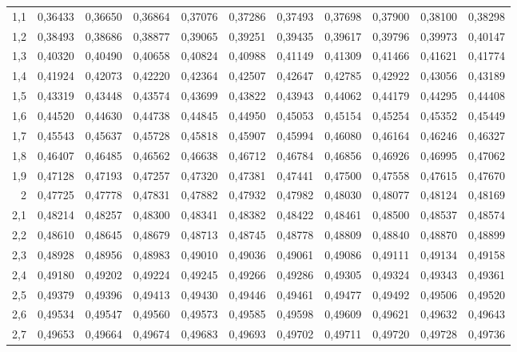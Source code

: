 \documentclass[12pt,a4paper]{article}
\begin{document}
\begin{table}[H]
\begin{tabular}{rrrrrrrrrrr}
    1,1   & 0,36433 & 0,36650 & 0,36864 & 0,37076 & 0,37286 & 0,37493 & 0,37698 & 0,37900 & 0,38100 & 0,38298 \\
    1,2   & 0,38493 & 0,38686 & 0,38877 & 0,39065 & 0,39251 & 0,39435 & 0,39617 & 0,39796 & 0,39973 & 0,40147 \\
    1,3   & 0,40320 & 0,40490 & 0,40658 & 0,40824 & 0,40988 & 0,41149 & 0,41309 & 0,41466 & 0,41621 & 0,41774 \\
    1,4   & 0,41924 & 0,42073 & 0,42220 & 0,42364 & 0,42507 & 0,42647 & 0,42785 & 0,42922 & 0,43056 & 0,43189 \\
    1,5   & 0,43319 & 0,43448 & 0,43574 & 0,43699 & 0,43822 & 0,43943 & 0,44062 & 0,44179 & 0,44295 & 0,44408 \\
    1,6   & 0,44520 & 0,44630 & 0,44738 & 0,44845 & 0,44950 & 0,45053 & 0,45154 & 0,45254 & 0,45352 & 0,45449 \\
    1,7   & 0,45543 & 0,45637 & 0,45728 & 0,45818 & 0,45907 & 0,45994 & 0,46080 & 0,46164 & 0,46246 & 0,46327 \\
    1,8   & 0,46407 & 0,46485 & 0,46562 & 0,46638 & 0,46712 & 0,46784 & 0,46856 & 0,46926 & 0,46995 & 0,47062 \\
    1,9   & 0,47128 & 0,47193 & 0,47257 & 0,47320 & 0,47381 & 0,47441 & 0,47500 & 0,47558 & 0,47615 & 0,47670 \\
    2     & 0,47725 & 0,47778 & 0,47831 & 0,47882 & 0,47932 & 0,47982 & 0,48030 & 0,48077 & 0,48124 & 0,48169 \\
    2,1   & 0,48214 & 0,48257 & 0,48300 & 0,48341 & 0,48382 & 0,48422 & 0,48461 & 0,48500 & 0,48537 & 0,48574 \\
    2,2   & 0,48610 & 0,48645 & 0,48679 & 0,48713 & 0,48745 & 0,48778 & 0,48809 & 0,48840 & 0,48870 & 0,48899 \\
    2,3   & 0,48928 & 0,48956 & 0,48983 & 0,49010 & 0,49036 & 0,49061 & 0,49086 & 0,49111 & 0,49134 & 0,49158 \\
    2,4   & 0,49180 & 0,49202 & 0,49224 & 0,49245 & 0,49266 & 0,49286 & 0,49305 & 0,49324 & 0,49343 & 0,49361 \\
    2,5   & 0,49379 & 0,49396 & 0,49413 & 0,49430 & 0,49446 & 0,49461 & 0,49477 & 0,49492 & 0,49506 & 0,49520 \\
    2,6   & 0,49534 & 0,49547 & 0,49560 & 0,49573 & 0,49585 & 0,49598 & 0,49609 & 0,49621 & 0,49632 & 0,49643 \\
    2,7   & 0,49653 & 0,49664 & 0,49674 & 0,49683 & 0,49693 & 0,49702 & 0,49711 & 0,49720 & 0,49728 & 0,49736 \\

\end{tabular}
\end{table}
\end{document}
